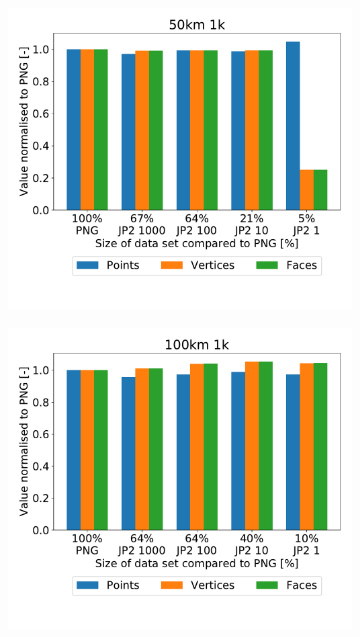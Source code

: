\begin{figure}[htb]
    \centering
        \begin{subfigure}[b]{0.49\textwidth}
            \centering
            \includegraphics[width=\textwidth]{doc/thesis/0_figures/recon/50km_1k}
            \caption{}
            \label{fig:recon_120_50_1}
        \end{subfigure}
        \begin{subfigure}[b]{0.49\textwidth}
            \centering
            \includegraphics[width=\textwidth]{doc/thesis/0_figures/recon/100km_1k}

\end{subfigure}
\end{figure}
